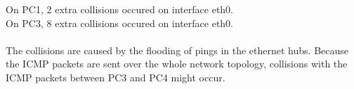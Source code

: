 On PC1, 2 extra collisions occured on interface eth0. \\
On PC3, 8 extra collisions occured on interface eth0. \\ \\

The collisions are caused by the flooding of pings in the ethernet hubs. Because the ICMP packets are sent over the whole network topology, collisions with the ICMP packets between PC3 and PC4 might occur.
